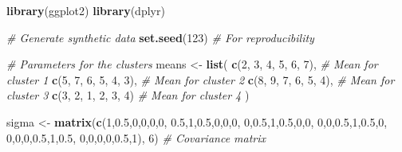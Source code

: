 \documentclass[
]{article}
\newenvironment{Shaded}{\begin{snugshade}}{\end{snugshade}}
\newcommand{\CommentTok}[1]{\textcolor[rgb]{0.56,0.35,0.01}{\textit{#1}}}
\newcommand{\DecValTok}[1]{\textcolor[rgb]{0.00,0.00,0.81}{#1}}
\newcommand{\FloatTok}[1]{\textcolor[rgb]{0.00,0.00,0.81}{#1}}
\newcommand{\FunctionTok}[1]{\textcolor[rgb]{0.13,0.29,0.53}{\textbf{#1}}}
\newcommand{\NormalTok}[1]{#1}
\newcommand{\OtherTok}[1]{\textcolor[rgb]{0.56,0.35,0.01}{#1}}
\begin{document}
\begin{Shaded}
\begin{Highlighting}[]
\FunctionTok{library}\NormalTok{(ggplot2)}
\FunctionTok{library}\NormalTok{(dplyr)}

\CommentTok{\# Generate synthetic data}
\FunctionTok{set.seed}\NormalTok{(}\DecValTok{123}\NormalTok{) }\CommentTok{\# For reproducibility}

\CommentTok{\# Parameters for the clusters}
\NormalTok{means }\OtherTok{\textless{}{-}} \FunctionTok{list}\NormalTok{(}
  \FunctionTok{c}\NormalTok{(}\DecValTok{2}\NormalTok{, }\DecValTok{3}\NormalTok{, }\DecValTok{4}\NormalTok{, }\DecValTok{5}\NormalTok{, }\DecValTok{6}\NormalTok{, }\DecValTok{7}\NormalTok{),   }\CommentTok{\# Mean for cluster 1}
  \FunctionTok{c}\NormalTok{(}\DecValTok{5}\NormalTok{, }\DecValTok{7}\NormalTok{, }\DecValTok{6}\NormalTok{, }\DecValTok{5}\NormalTok{, }\DecValTok{4}\NormalTok{, }\DecValTok{3}\NormalTok{),   }\CommentTok{\# Mean for cluster 2}
  \FunctionTok{c}\NormalTok{(}\DecValTok{8}\NormalTok{, }\DecValTok{9}\NormalTok{, }\DecValTok{7}\NormalTok{, }\DecValTok{6}\NormalTok{, }\DecValTok{5}\NormalTok{, }\DecValTok{4}\NormalTok{),   }\CommentTok{\# Mean for cluster 3}
  \FunctionTok{c}\NormalTok{(}\DecValTok{3}\NormalTok{, }\DecValTok{2}\NormalTok{, }\DecValTok{1}\NormalTok{, }\DecValTok{2}\NormalTok{, }\DecValTok{3}\NormalTok{, }\DecValTok{4}\NormalTok{)    }\CommentTok{\# Mean for cluster 4}
\NormalTok{)}

\NormalTok{sigma }\OtherTok{\textless{}{-}} \FunctionTok{matrix}\NormalTok{(}\FunctionTok{c}\NormalTok{(}\DecValTok{1}\NormalTok{,}\FloatTok{0.5}\NormalTok{,}\DecValTok{0}\NormalTok{,}\DecValTok{0}\NormalTok{,}\DecValTok{0}\NormalTok{,}\DecValTok{0}\NormalTok{,  }\FloatTok{0.5}\NormalTok{,}\DecValTok{1}\NormalTok{,}\FloatTok{0.5}\NormalTok{,}\DecValTok{0}\NormalTok{,}\DecValTok{0}\NormalTok{,}\DecValTok{0}\NormalTok{,  }\DecValTok{0}\NormalTok{,}\FloatTok{0.5}\NormalTok{,}\DecValTok{1}\NormalTok{,}\FloatTok{0.5}\NormalTok{,}\DecValTok{0}\NormalTok{,}\DecValTok{0}\NormalTok{,  }\DecValTok{0}\NormalTok{,}\DecValTok{0}\NormalTok{,}\FloatTok{0.5}\NormalTok{,}\DecValTok{1}\NormalTok{,}\FloatTok{0.5}\NormalTok{,}\DecValTok{0}\NormalTok{,  }\DecValTok{0}\NormalTok{,}\DecValTok{0}\NormalTok{,}\DecValTok{0}\NormalTok{,}\FloatTok{0.5}\NormalTok{,}\DecValTok{1}\NormalTok{,}\FloatTok{0.5}\NormalTok{,  }\DecValTok{0}\NormalTok{,}\DecValTok{0}\NormalTok{,}\DecValTok{0}\NormalTok{,}\DecValTok{0}\NormalTok{,}\FloatTok{0.5}\NormalTok{,}\DecValTok{1}\NormalTok{), }\DecValTok{6}\NormalTok{) }\CommentTok{\# Covariance matrix}


\end{Highlighting}
\end{Shaded}
\end{document}

